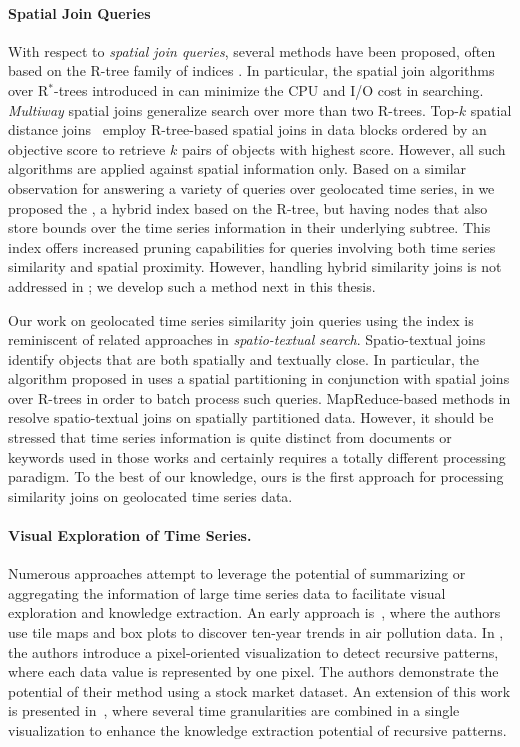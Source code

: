 \paragraph{Spatial Join Queries} With respect to {\em spatial join queries}, several methods have been proposed, often based on the R-tree family of indices \cite{Guttman1984, Beckmann1990}. In particular, the spatial join algorithms over R$^*$-trees introduced in \cite{DBLP:conf/sigmod/BrinkhoffKS93} can minimize the CPU and I/O cost in searching. {\em Multiway} spatial joins \cite{papadias1999processing} generalize search over more than two R-trees. Top-$k$ spatial distance joins~\cite{qi2013efficient} employ R-tree-based spatial joins in data blocks ordered by an objective score to retrieve $k$ pairs of objects with highest score. However, all such algorithms are applied against spatial information only. Based on a similar observation for answering a variety of queries over geolocated time series, in \cite{chatzig17btsr} we proposed the \btsr, a hybrid index based on the R-tree, but having nodes that also store bounds over the time series information in their underlying subtree. This index offers increased pruning capabilities for queries involving both time series similarity and spatial proximity. However, handling hybrid similarity joins is not addressed in \cite{chatzig17btsr}; we develop such a method next in this thesis.

Our work on geolocated time series similarity join queries using the \btsr index is reminiscent of related approaches in {\em spatio-textual search}. Spatio-textual joins identify objects that are both spatially and textually close. In particular, the algorithm proposed in \cite{Bouros:2012:SSJ:2428536.2428537} uses a spatial partitioning in conjunction with spatial joins over R-trees in order to batch process such queries. MapReduce-based methods in \cite{Zhang:2014:ESS:2682647.2682773} resolve spatio-textual joins on spatially partitioned data. However, it should be stressed that time series information is quite distinct from documents or keywords used in those works and certainly requires a totally different processing paradigm. To the best of our knowledge, ours is the first approach for processing similarity joins on geolocated time series data.

\paragraph{Visual Exploration of Time Series.} Numerous approaches attempt to leverage the potential of summarizing or aggregating the information of large time series data to facilitate visual exploration and knowledge extraction. An early approach is~\cite{mintz1997tracking}, where the authors use tile maps and box plots to discover ten-year trends in air pollution data. In \cite{keim1995recursive}, the authors introduce a pixel-oriented visualization to detect recursive patterns, where each data value is represented by one pixel. The authors demonstrate the potential of their method using a stock market dataset. An extension of this work is presented in~\cite{lammarsch2009hierarchical}, where several time granularities are combined in a single visualization to enhance the knowledge extraction potential of recursive patterns. 

